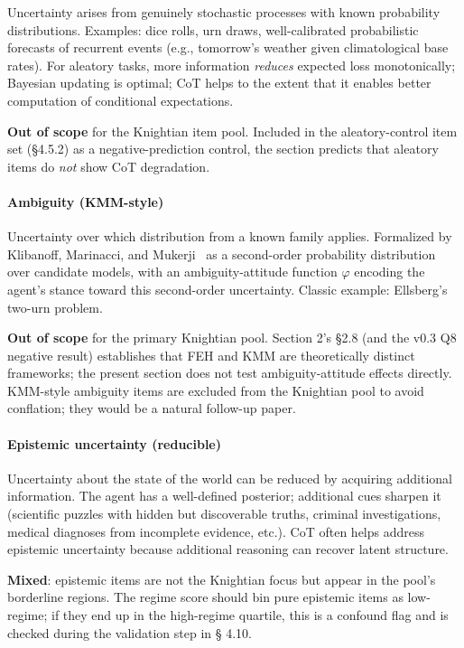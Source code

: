 \documentclass{article}
\begin{document}
Uncertainty arises from genuinely stochastic processes with known
probability distributions. Examples: dice rolls, urn draws,
well-calibrated probabilistic forecasts of recurrent events (e.g.,
tomorrow's weather given climatological base rates). For aleatory tasks,
more information \emph{reduces} expected loss monotonically; Bayesian
updating is optimal; CoT helps to the extent that it enables better
computation of conditional expectations.

\textbf{Out of scope} for the Knightian item pool. Included in the
aleatory-control item set (\S{}4.5.2) as a negative-prediction control, the
section predicts that aleatory items do \emph{not} show CoT degradation.

\paragraph{Ambiguity (KMM-style)}\label{ambiguity-kmm-style}

Uncertainty over which distribution from a known family applies.
Formalized by Klibanoff, Marinacci, and Mukerji~\cite{klibanoff2005} as a second-order
probability distribution over candidate models, with an
ambiguity-attitude function \(\varphi\) encoding the agent's stance
toward this second-order uncertainty. Classic example: Ellsberg's
two-urn problem.

\textbf{Out of scope} for the primary Knightian pool. Section 2's \S{}2.8
(and the v0.3 Q8 negative result) establishes that FEH and KMM are
theoretically distinct frameworks; the present section does not test
ambiguity-attitude effects directly. KMM-style ambiguity items are
excluded from the Knightian pool to avoid conflation; they would be a
natural follow-up paper.

\paragraph{Epistemic uncertainty
(reducible)}\label{epistemic-uncertainty-reducible}

Uncertainty about the state of the world can be reduced by acquiring
additional information. The agent has a well-defined posterior;
additional cues sharpen it (scientific puzzles with hidden but
discoverable truths, criminal investigations, medical diagnoses from
incomplete evidence, etc.). CoT often helps address epistemic
uncertainty because additional reasoning can recover latent structure.

\textbf{Mixed}: epistemic items are not the Knightian focus but appear
in the pool's borderline regions. The regime score should bin pure
epistemic items as low-regime; if they end up in the high-regime
quartile, this is a confound flag and is checked during the validation
step in \S{} 4.10.
\end{document}
